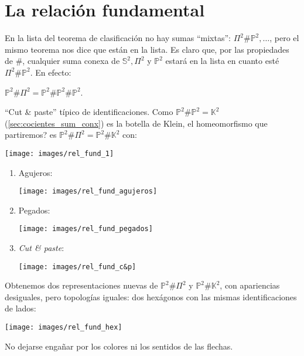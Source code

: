 \section{La relación fundamental}%
\label{sec:la_relacion_fundamental}
En la lista del teorema de clasificación no hay sumas ``mixtas'': $\Pi^2 \# \mathbb{P}^{2},\ldots$, pero el mismo teorema nos dice que están en la lista. Es claro que, por las propiedades de $\#$, cualquier suma conexa de $\mathbb{S}^{2}, \Pi^2$ y $\mathbb{P}^{2}$ estará en la lista en cuanto esté $\Pi^2 \# \mathbb{P}^{2}$. En efecto:

\begin{prop}
$\mathbb{P}^{2} \# \Pi^2 = \mathbb{P}^{2} \# \mathbb{P}^{2} \# \mathbb{P}^{2}$.
\end{prop}
\begin{demo}
    ``Cut \& paste'' típico de identificaciones. Como $\mathbb{P}^{2} \# \mathbb{P}^{2} = \mathbb{K}^2$ (\ref{sec:cocientes_sum_conx}) es la botella de Klein, el homeomorfismo que partiremos? es $\mathbb{P}^{2} \# \Pi^2 = \mathbb{P}^{2} \# \mathbb{K}^2$ con:
    \begin{center}
        \texttt{[image: images/rel\_fund\_1]} 
    \end{center}

    \begin{enumerate}
        \item Agujeros:
        \begin{center}
            \texttt{[image: images/rel\_fund\_agujeros]} 
        \end{center}

        \item Pegados:
        \begin{center}
            \texttt{[image: images/rel\_fund\_pegados]} 
        \end{center}

        \item \textit{Cut \& paste}:
        \begin{center}
            \texttt{[image: images/rel\_fund\_c\&p]} 
        \end{center}
    \end{enumerate}
    Obtenemos dos representaciones nuevas de $\mathbb{P}^{2} \# \Pi^2$ y $\mathbb{P}^{2} \# \mathbb{K}^2$, con apariencias desiguales, pero topologías iguales: dos hexágonos con las mismas identificaciones de lados:
    \begin{center}
        \texttt{[image: images/rel\_fund\_hex]} 
    \end{center}
    No dejarse engañar por los colores ni los sentidos de las flechas.
\end{demo}

